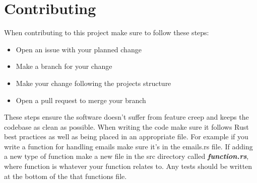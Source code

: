 \documentclass[12pt]{article}
\begin{document}
\section{Contributing}
When contributing to this project make sure to follow these steps:

\begin{itemize}
    \item Open an issue with your planned change
    \item Make a branch for your change
    \item Make your change following the projects structure
    \item Open a pull request to merge your branch
\end{itemize}

These steps ensure the software doesn't suffer from feature creep and keeps the 
codebase as clean as possible. When writing the code make sure it follows Rust 
best practices as well as being placed in an appropriate file. For example if 
you write a function for handling emails make sure it's in the emails.rs file. 
If adding a new type of function make a new file in the src directory 
called \textbf{\textit{function.rs}}, where function is whatever your function 
relates to. Any tests should be written at the bottom of the that functions file.
\end{document}
